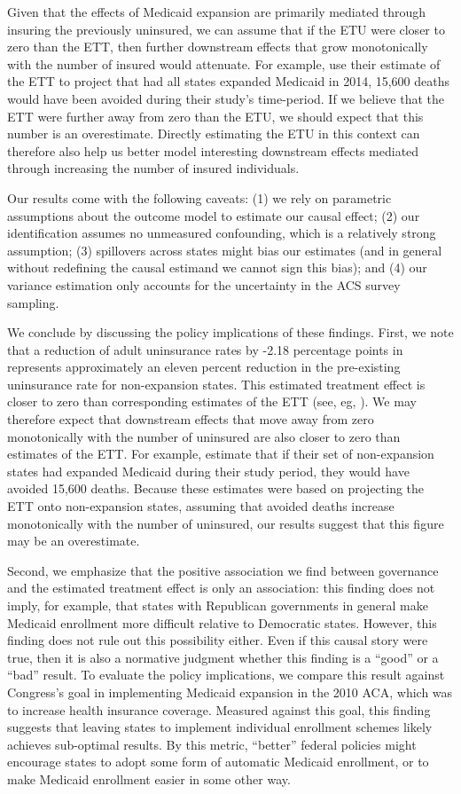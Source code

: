 \documentclass[12pt]{article}
\begin{document}
Given that the effects of Medicaid expansion are primarily mediated through insuring the previously uninsured, we can assume that if the ETU were closer to zero than the ETT, then further downstream effects that grow monotonically with the number of insured would attenuate. For example, \cite{miller2019medicaid} use their estimate of the ETT to project that had all states expanded Medicaid in 2014, 15,600 deaths would have been avoided during their study's time-period. If we believe that the ETT were further away from zero than the ETU, we should expect that this number is an overestimate. Directly estimating the ETU in this context can therefore also help us better model interesting downstream effects mediated through increasing the number of insured individuals.

Our results come with the following caveats: (1) we rely on parametric assumptions about the outcome model to estimate our causal effect; (2) our identification assumes no unmeasured confounding, which is a relatively strong assumption; (3) spillovers across states might bias our estimates (and in general without redefining the causal estimand we cannot sign this bias); and (4) our variance estimation only accounts for the uncertainty in the ACS survey sampling. 

We conclude by discussing the policy implications of these findings. First, we note that a reduction of adult uninsurance rates by -2.18 percentage points in represents approximately an eleven percent reduction in the pre-existing uninsurance rate for non-expansion states. This estimated treatment effect is closer to zero than corresponding estimates of the ETT (see, eg, \cite{courtemanche2017early}). We may therefore expect that downstream effects that move away from zero monotonically with the number of uninsured are also closer to zero than estimates of the ETT. For example, \cite{miller2019medicaid} estimate that if their set of non-expansion states had expanded Medicaid during their study period, they would have avoided 15,600 deaths. Because these estimates were based on projecting the ETT onto non-expansion states, assuming that avoided deaths increase monotonically with the number of uninsured, our results suggest that this figure may be an overestimate.

Second, we emphasize that the positive association we find between governance and the estimated treatment effect is only an association: this finding does not imply, for example, that states with Republican governments in general make Medicaid enrollment more difficult relative to Democratic states. However, this finding does not rule out this possibility either. Even if this causal story were true, then it is also a normative judgment whether this finding is a ``good'' or a ``bad'' result. To evaluate the policy implications, we compare this result against Congress's goal in implementing Medicaid expansion in the 2010 ACA, which was to increase health insurance coverage. Measured against this goal, this finding suggests that leaving states to implement individual enrollment schemes likely achieves sub-optimal results. By this metric, ``better'' federal policies might encourage states to adopt some form of automatic Medicaid enrollment, or to make Medicaid enrollment easier in some other way.
\end{document}
